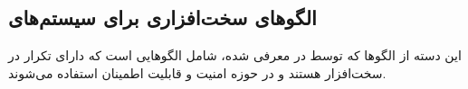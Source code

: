 \subsection{الگوهای سخت‌افزاری برای سیستم‌های }
\begin{RTL}
این دسته از الگوها که توسط  در \cite{ref5} معرفی
شده، شامل الگوهایی است که دارای تکرار در سخت‌افزار هستند و
در حوزه امنیت و قابلیت اطمینان استفاده می‌شوند.
\end{RTL}








